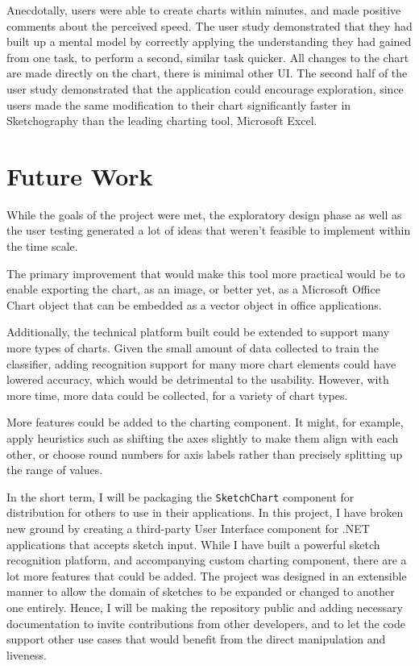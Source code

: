 	Anecdotally, users were able to create charts within minutes, and made positive comments about the perceived speed. The user study demonstrated that they had built up a mental model by correctly applying the understanding they had gained from one task, to perform a second, similar task quicker. All changes to the chart are made directly on the chart, there is minimal other UI. The second half of the user study demonstrated that the application could encourage exploration, since users made the same modification to their chart significantly faster in Sketchography than the leading charting tool, Microsoft Excel.
	
\section{Future Work}
While the goals of the project were met, the exploratory design phase as well as the user testing generated a lot of ideas that weren't feasible to implement within the time scale.

The primary improvement that would make this tool more practical would be to enable exporting the chart, as an image, or better yet, as a Microsoft Office Chart object that can be embedded as a vector object in office applications.

Additionally, the technical platform built could be extended to support many more types of charts. Given the small amount of data collected to train the classifier, adding recognition support for many more chart elements could have lowered accuracy, which would be detrimental to the usability. However, with more time, more data could be collected, for a variety of chart types.

More features could be added to the charting component. It might, for example, apply heuristics such as shifting the axes slightly to make them align with each other, or choose round numbers for axis labels rather than precisely splitting up the range of values.

In the short term, I will be packaging the \texttt{SketchChart} component for distribution for others to use in their applications. In this project, I have broken new ground by creating a third-party User Interface component for .NET applications that accepts sketch input. While I have built a powerful sketch recognition platform, and accompanying custom charting component, there are a lot more features that could be added. The project was designed in an extensible manner to allow the domain of sketches to be expanded or changed to another one entirely. Hence, I will be making the repository public and adding necessary documentation to invite contributions from other developers, and to let the code support other use cases that would benefit from the direct manipulation and liveness.

